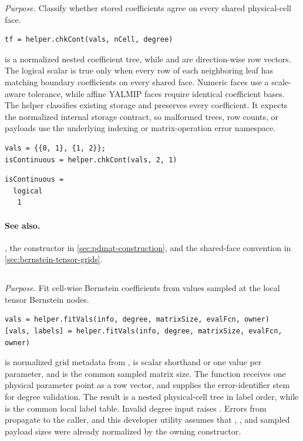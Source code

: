 \textit{Purpose.} Classify whether stored coefficients agree on every shared physical-cell face.

\syntaxhead
\begin{lstlisting}[style=dpsyntax]
tf = helper.chkCont(vals, nCell, degree)
\end{lstlisting}

\descriptionhead
{} is a normalized nested coefficient tree, while  and  are direction-wise row vectors. The logical scalar  is true only when every row of each neighboring leaf has matching boundary coefficients on every shared face. Numeric faces use a scale-aware tolerance, while affine YALMIP faces require identical coefficient bases. The helper classifies existing storage and preserves every coefficient. It expects the normalized internal storage contract, so malformed trees, row counts, or payloads use the underlying indexing or matrix-operation error namespace.

\examplehead
\begin{lstlisting}[style=dpmatlab]
vals = {{0, 1}, {1, 2}};
isContinuous = helper.chkCont(vals, 2, 1)
\end{lstlisting}
\begin{lstlisting}[style=dpoutput]
isContinuous =
  logical
   1
\end{lstlisting}

\paragraph{See also.} , the  constructor in \cref{sec:pdmat-construction}, and the shared-face convention in \cref{sec:bernstein-tensor-grids}.

\subsection{\texorpdfstring{}{helper.fitVals}}

\textit{Purpose.} Fit cell-wise Bernstein coefficients from values sampled at the local tensor Bernstein nodes.

\syntaxhead
\begin{lstlisting}[style=dpsyntax]
vals = helper.fitVals(info, degree, matrixSize, evalFcn, owner)
[vals, labels] = helper.fitVals(info, degree, matrixSize, evalFcn, owner)
\end{lstlisting}

\descriptionhead
{} is normalized grid metadata from ,  is scalar shorthand or one value per parameter, and  is the common sampled matrix size. The function  receives one physical parameter point as a row vector, and  supplies the error-identifier stem for degree validation. The result  is a nested physical-cell tree in  label order, while  is the common local label table. Invalid degree input raises . Errors from  propagate to the caller, and this developer utility assumes that , , and sampled payload sizes were already normalized by the owning constructor.

